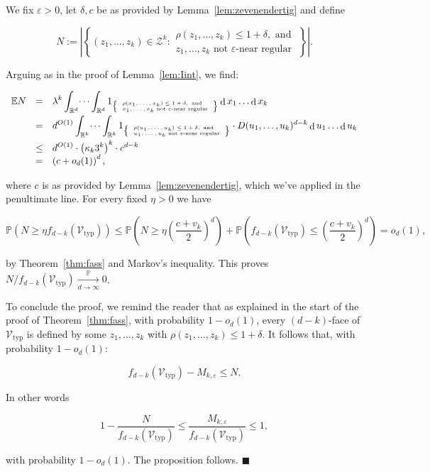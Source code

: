 \documentclass[11pt]{article}%
\newenvironment{proofof}[1]{\vspace{1ex}\noindent{\bf Proof of #1.}}{\hspace*{\fill}$\blacksquare$\vspace{1ex}}
\newcommand{\Vcal}[0]{\ensuremath{{\mathcal V}}}
\newcommand{\Zcal}[0]{\ensuremath{{\mathcal Z}}}
\newcommand{\eR}[0]{\ensuremath{ \mathbb R}}
\newcommand{\Pee}[0]{\ensuremath{{\mathbb P}}}
\newcommand{\Ee}[0]{\ensuremath{{\mathbb E}}}
\newcommand{\eps}{\varepsilon}
\DeclareMathOperator{\dd}{d}
\newcommand{\Vtyp}[0]{\Vcal_{\text{typ}}}
\begin{document}
\begin{proofof}{Proposition~\ref{prop:Nkeps}}
We fix $\eps>0$, let $\delta, c$ be as provided by Lemma~\ref{lem:zevenendertig} and define

$$ N := \left|\left\{ (z_1,\dots,z_k) \in \Zcal^k :
\begin{array}{l} \rho(z_1,\dots,z_k) \leq 1+\delta, \text{ and }\\
z_1,\dots,z_k \text{ not $\eps$-near regular}
\end{array} \right\}\right|. $$

\noindent 
Arguing as in the proof of Lemma~\ref{lem:Iint}, we find:

$$ \begin{array}{rcl}
 \Ee N 
 & = & \displaystyle 
\lambda^k \int_{\eR^d}\dots\int_{\eR^d}
 1_{\tiny\left\{\begin{array}{l} \rho(x_1,\dots,x_k) \leq 1+\delta, \text{ and }\\
x_1,\dots,x_k \text{ not $\eps$-near regular}
\end{array}\right\}} \dd x_1\dots\dd x_k \\[2ex]
& = & \displaystyle 
d^{O(1)} \int_{\eR^k}\dots\int_{\eR^k}
 1_{\tiny\left\{\begin{array}{l} \rho(u_1,\dots,u_k) \leq 1+\delta, \text{ and }\\
u_1,\dots,u_k \text{ not $\eps$-near regular}
\end{array}\right\}} \cdot D(u_1,\dots,u_k)^{d-k}\dd u_1\dots\dd u_k \\[2ex]
& \leq & \displaystyle
d^{O(1)} \cdot \left( \kappa_k 3^k \right)^k \cdot c^{d-k} \\
& = & \displaystyle 
\left( c + o_d(1) \right)^d, 
\end{array} $$

\noindent 
where $c$ is as provided by Lemma~\ref{lem:zevenendertig}, which we've applied in the penultimate line.
For every fixed $\eta>0$ we have

$$ \Pee\left( N \geq \eta f_{d-k}(\Vtyp) \right) 
\leq 
\Pee\left( N \geq \eta \left(\frac{c+v_k}{2}\right)^d \right) 
+ \Pee\left( f_{d-k}(\Vtyp) \leq \left(\frac{c+v_k}{2}\right)^d \right) 
= o_d(1), $$

\noindent
by Theorem~\ref{thm:fass} and Markov's inequality.
This proves $N / f_{d-k}(\Vtyp) \xrightarrow[d\to\infty]{\Pee} 0$.

To conclude the proof, we remind the reader that as explained in the start of the proof of Theorem~\ref{thm:fass}, with 
probability $1-o_d(1)$, every 
$(d-k)$-face of $\Vtyp$ is defined by some $z_1,\dots,z_k$ with $\rho(z_1,\dots,z_k) \leq 1+\delta$.
It follows that, with probability $1-o_d(1)$:

$$ f_{d-k}(\Vtyp) - M_{k,\eps} \leq N. $$

\noindent
In other words 

$$1 - \frac{N}{f_{d-k}(\Vtyp)} \leq \frac{M_{k,\eps}}{f_{d-k}(\Vtyp)} \leq 1, $$ 

\noindent
with probability $1-o_d(1)$. 
The proposition follows.
\end{proofof}
\end{document}
